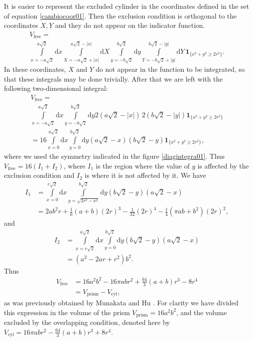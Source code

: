 \documentclass[letterpaper,10pt, jcp, aps]{revtex4-1}
\newcommand{\rd}{\!\mathrm{d}}
\newcommand{\indicator}[1]{\mathbf{1}_{ \{   #1 \} } }
\begin{document}
It is easier to represent the  
excluded cylinder in the coordinates defined in 
the set of equation \ref{cambiocoor01}. Then the exclusion condition
is orthogonal to the coordinates $X,Y$ and they do not appear
on the indicator function. 
\begin{multline}\label{integraltotal}
 V_\text{free} = \\ \int\limits_{x=-a \sqrt{2}}^{a \sqrt{2}} \rd x 
\int\limits_{X=-a \sqrt{2} + |x| }^{a \sqrt{2} - |x|}  \rd X
 \int\limits_{y=-b \sqrt{2}}^{b \sqrt{2}} \rd y
\int\limits_{Y=-b \sqrt{2} + |y| }^{b \sqrt{2}-|y|}  \rd Y
\, \indicator{ x^2 + y^2 \ge 2r^2  }.
\end{multline}
In these coordinates, $X$ and $Y$ do not appear in the function to be
integrated, 
so that these integrals may be done trivially. After that we are left 
with the  following two-dimensional integral:
\begin{multline}
 V_\text{free}  = \\ \int\limits_{x=-a \sqrt{2}}^{a \sqrt{2}} \rd x  \int\limits_{y=-b \sqrt{2}}^{b \sqrt{2}} \rd y
2 \left( a \sqrt{2} - |x| \right) \, 2 \left( b \sqrt{2} - |y| \right) \indicator{ x^2 + y^2 \ge 2r^2 } \\
 = 16 \int\limits_{x=0}^{a \sqrt{2}} \rd x  \int\limits_{y=0}^{b \sqrt{2}} \rd y 
\left( a \sqrt{2} - x \right) \left( b \sqrt{2} - y \right) \indicator{ x^2 + y^2 \ge 2r^2 },
\end{multline}
where we used the symmetry indicated in the figure \ref{diagintegra01}.
Thus $V_\text{free} = 16(I_1 + I_2)$, where $I_1$ is the region where the value of $y$
is affected by the exclusion condition and $I_2$ is where it is not affected
by it. 
We have
\begin{align}
 I_1 &= \int\limits_{x=0}^{r\sqrt{2}} \rd x \int\limits_{y = \sqrt{ 2r^2 - x^2}}^{b \sqrt{2}} \rd y
\left( b \sqrt{2} - y \right)  \left( a \sqrt{2} - x \right) \\
&= 	
2 a b^{2} r  + \textstyle \frac{1}{6} (a+b) (2r)^{3} - \frac{1}{32}  (2r)^{4} - \frac{1}{4} {\left(\pi a b + b^{2}\right)} (2r)^2,
\end{align}
and
\begin{align}
 I_2 &= \int\limits_{x=r  \sqrt{2}}^{a \sqrt{2}} \rd x  \int\limits_{y = 0}^{b \sqrt{2}} \rd y
 \left( b \sqrt{2} - y \right)  \left( a \sqrt{2} - x \right)  \\
&=	
{\left( a^{2} - 2ar +   r^{2}\right)} b^{2}.
\end{align}
Thus 
\begin{align}\label{volumeabd}
 V_\text{free}
 & =  16 a^{2} b^{2}  - 16 \pi a b r^{2} + \textstyle \frac{64}{3} (a+b) r^{3}  - 8 r^{4} \\
&= V_\text{prism} - V_\text{cyl},
\end{align}
as was previously obtained by Munakata and Hu \cite{Munakata02}.
For clarity we have divided this expression in the volume of the prism 
$V_\text{prism}=16 a^2 b^2$, and  the volume excluded by the overlapping
condition, denoted here by 
$V_\text{cyl}=  16 \pi a b r^{2} - \textstyle \frac{64}{3} (a+b) r^{3}  + 8 r^{4}$.
\end{document}
